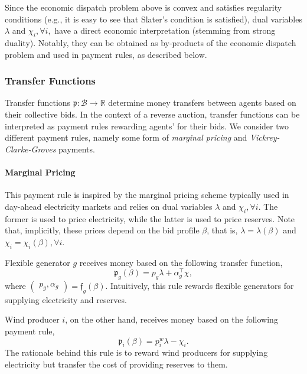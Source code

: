 \documentclass{article}
\begin{document}
Since the economic dispatch problem above is convex and satisfies regularity conditions (e.g., it is easy to see that Slater's condition is satisfied), dual variables $\lambda$ and $\chi_i, \forall i,$ have a direct economic interpretation (stemming from strong duality). Notably, they can be obtained as by-products of the economic dispatch problem and used in payment rules, as described below.

\subsubsection{Transfer Functions}

Transfer functions $\mathfrak{p}: \mathcal{B} \rightarrow \mathbb{R}$ determine money transfers between agents based on their collective bids. In the context of a reverse auction, transfer functions can be interpreted as payment rules rewarding agents' for their bids. We consider two different payment rules, namely some form of \textit{marginal pricing} and \textit{Vickrey-Clarke-Groves} payments.

\paragraph{Marginal Pricing} This payment rule is inspired by the marginal pricing scheme typically used in day-ahead electricity markets and relies on dual variables $\lambda$ and $\chi_i, \forall i$. The former is used to price electricity, while the latter is used to price reserves. Note that, implicitly, these prices depend on the bid profile $\beta$, that is, $\lambda = \lambda(\beta)$ and $\chi_i = \chi_i(\beta), \forall i$.

Flexible generator $g$ receives money based on the following transfer function,
\begin{equation*}
\mathfrak{p}_g(\beta) = p_g \lambda + \alpha_g^\top \chi,
\end{equation*}
where $\begin{pmatrix} p_g, \alpha_g \end{pmatrix} = \mathfrak{f}_g(\beta)$. Intuitively, this rule rewards flexible generators for supplying electricity and reserves.

Wind producer $i$, on the other hand, receives money based on the following payment rule,
\begin{equation*}
\mathfrak{p}_i(\beta) = p_i^w \lambda - \chi_i.
\end{equation*}
The rationale behind this rule is to reward wind producers for supplying electricity but transfer the cost of providing reserves to them.
\end{document}
